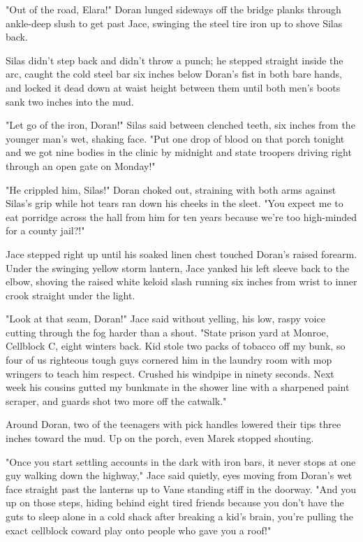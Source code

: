 "Out of the road, Elara!" Doran lunged sideways off the bridge planks through ankle-deep slush to get past Jace, swinging the steel tire iron up to shove Silas back.

Silas didn't step back and didn't throw a punch; he stepped straight inside the arc, caught the cold steel bar six inches below Doran's fist in both bare hands, and locked it dead down at waist height between them until both men's boots sank two inches into the mud.

"Let go of the iron, Doran!" Silas said between clenched teeth, six inches from the younger man's wet, shaking face. "Put one drop of blood on that porch tonight and we got nine bodies in the clinic by midnight and state troopers driving right through an open gate on Monday!"

"He crippled him, Silas!" Doran choked out, straining with both arms against Silas's grip while hot tears ran down his cheeks in the sleet. "You expect me to eat porridge across the hall from him for ten years because we're too high-minded for a county jail?!"

Jace stepped right up until his soaked linen chest touched Doran's raised forearm. Under the swinging yellow storm lantern, Jace yanked his left sleeve back to the elbow, shoving the raised white keloid slash running six inches from wrist to inner crook straight under the light.

"Look at that seam, Doran!" Jace said without yelling, his low, raspy voice cutting through the fog harder than a shout. "State prison yard at Monroe, Cellblock C, eight winters back. Kid stole two packs of tobacco off my bunk, so four of us righteous tough guys cornered him in the laundry room with mop wringers to teach him respect. Crushed his windpipe in ninety seconds. Next week his cousins gutted my bunkmate in the shower line with a sharpened paint scraper, and guards shot two more off the catwalk."

Around Doran, two of the teenagers with pick handles lowered their tips three inches toward the mud. Up on the porch, even Marek stopped shouting.

"Once you start settling accounts in the dark with iron bars, it never stops at one guy walking down the highway," Jace said quietly, eyes moving from Doran's wet face straight past the lanterns up to Vane standing stiff in the doorway. "And you up on those steps, hiding behind eight tired friends because you don't have the guts to sleep alone in a cold shack after breaking a kid's brain, you're pulling the exact cellblock coward play onto people who gave you a roof!"

